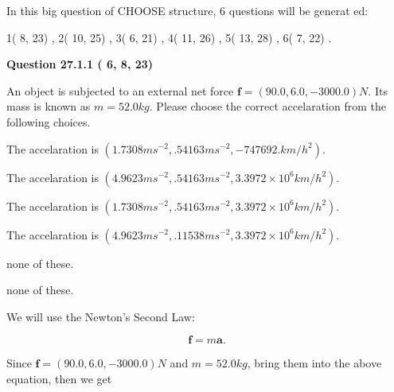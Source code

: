 \documentclass[12pt]{article}
\begin{document}
   
\vspace{0.2in}
   
 In this big question of CHOOSE structure,           6 questions will be generat
 ed: 
  
  
            1(          8,         23)
 ,
            2(         10,         25)
 ,
            3(          6,         21)
 ,
            4(         11,         26)
 ,
            5(         13,         28)
 ,
            6(          7,         22)
 .
  
\vspace{0.2in}
  
{\textbf{\Large{Question
27.1.1 
 (          6,          8,         23)
}}}
  
  
 
An object is subjected to an external net force $\mathbf{f}=(
90.0 ,
6.0,
-3000.0  )N$. Its mass is known as
$m= %
52.0  kg$. Please choose the correct accelaration
from the following choices.
 
 
 
The accelaration is
$(
1.7308ms^{-2},
.54163ms^{-2},
-747692.km/h^2
).
$
 
 
The accelaration is
$(
4.9623ms^{-2},
.54163ms^{-2},
3.3972 \times 10^{6}km/h^2
).
$
 
 
The accelaration is
$(
1.7308ms^{-2},
.54163ms^{-2},
3.3972 \times 10^{6}km/h^2
).
$
 
 
The accelaration is
$(
4.9623ms^{-2},
.11538ms^{-2},
3.3972 \times 10^{6}km/h^2
).
$
 
 
none of these.
 
 
\noindent{}
 
 
none of these.
 
 
\noindent{}
 
 
 
 
 
 
\noindent{}
 
 

We will use the Newton's Second Law:
 
\[
\mathbf{f}=m\mathbf{a}.
\]
 
Since $\mathbf{f}=( %
90.0,  %
6.0,  %
-3000.0 )N$
and $m= %
52.0kg$, bring them into the above equation, then we get
 
\end{document}
